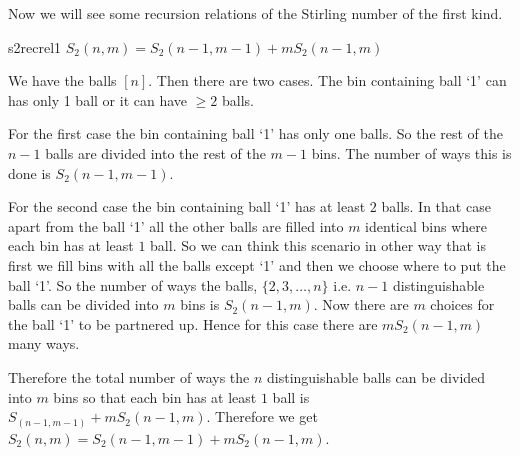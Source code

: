 Now we will see some recursion relations of the Stirling number of the first kind. 

\begin{lemma}{}{s2recrel1}
	$S_2(n,m)=S_2(n-1,m-1)+mS_2(n-1,m)$
\end{lemma}
\begin{combi-proof}
	We have the balls $[n]$. Then there are two cases. The bin containing ball `1' can has only 1 ball or it can have $\geq 2$ balls. 
	
	For the first case the bin containing ball `1' has only one balls. So the rest of the $n-1$ balls are divided into the rest of the $m-1$ bins. The number of ways this is done is $S_2(n-1,m-1)$.
	
	For the second case the bin containing ball `1' has at least $2$ balls. In that case apart from the ball `1' all the other balls are filled into $m$ identical bins where each bin has at least $1$ ball. So we can think this scenario in other way that is first we fill bins with all the balls except `1' and then we choose where to put the ball `1'. So the number of ways the balls, $\{2,3,\dots, n\}$ i.e. $n-1$ distinguishable balls can be divided into $m$ bins is $S_2(n-1,m)$. Now there are $m$ choices for the ball `1' to be partnered up. Hence for this case there are $mS_2(n-1,m)$ many ways.
	
	Therefore the total number of ways the $n$ distinguishable balls can be divided into $m$ bins so that each bin has at least $1$ ball is $S_(n-1,m-1)+mS_2(n-1,m)$. Therefore we get $S_2(n,m)=S_2(n-1,m-1)+mS_2(n-1,m)$.
\end{combi-proof}

